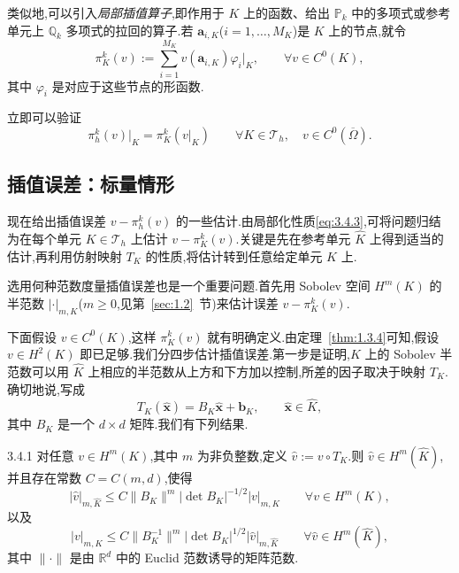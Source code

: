 类似地,可以引入\emph{局部插值算子},即作用于 \(K\) 上的函数、给出 \(\mathbb P_k\) 中的多项式或参考单元上 \(\mathbb Q_k\) 多项式的拉回的算子.若 \(\boldsymbol{a}_{i,K}\)(\(i=1,\ldots,M_K\))是 \(K\) 上的节点,就令
\begin{equation}\label{eq:3.4.2}
  \pi_K^k(v):=\sum_{i=1}^{M_K}v(\boldsymbol{a}_{i,K})\varphi_i|_K,
    \qquad \forall v\in C^0(K),
\end{equation}
其中 \(\varphi_i\) 是对应于这些节点的形函数.

立即可以验证
\begin{equation}\label{eq:3.4.3}
  \pi_h^k(v)|_K=\pi_K^k(v|_K)
  \qquad \forall K\in\mathcal T_h,\quad v\in C^0(\overline\Omega).
\end{equation}

\subsection{插值误差：标量情形}\label{sec:3.4.1}

现在给出插值误差 \(v-\pi_h^k(v)\) 的一些估计.由局部化性质\eqref{eq:3.4.3},可将问题归结为在每个单元 \(K\in\mathcal T_h\) 上估计 \(v-\pi_K^k(v)\).关键是先在参考单元 \(\widehat K\) 上得到适当的估计,再利用仿射映射 \(T_K\) 的性质,将估计转到任意给定单元 \(K\) 上.

选用何种范数度量插值误差也是一个重要问题.首先用 Sobolev 空间 \(H^m(K)\) 的半范数 \(|\cdot|_{m,K}\)(\(m\ge0\),见第~\ref{sec:1.2}~节)来估计误差 \(v-\pi_K^k(v)\).

下面假设 \(v\in C^0(K)\),这样 \(\pi_K^k(v)\) 就有明确定义.由定理~\ref{thm:1.3.4}可知,假设 \(v\in H^2(K)\) 即已足够.我们分四步估计插值误差.第一步是证明,\(K\) 上的 Sobolev 半范数可以用 \(\widehat K\) 上相应的半范数从上方和下方加以控制,所差的因子取决于映射 \(T_K\).确切地说,写成
\[
  T_K(\widehat{\boldsymbol{x}})=B_K\widehat{\boldsymbol{x}}+\boldsymbol{b}_K,
  \qquad \widehat{\boldsymbol{x}}\in\widehat K,
\]
其中 \(B_K\) 是一个 \(d\times d\) 矩阵.我们有下列结果.

\begin{proposition}[]{3.4.1}
对任意 \(v\in H^m(K)\),其中 \(m\) 为非负整数,定义 \(\widehat v:=v\circ T_K\).则 \(\widehat v\in H^m(\widehat K)\),并且存在常数 \(C=C(m,d)\),使得
\begin{equation}\label{eq:3.4.4}
  |\widehat v|_{m,\widehat K}\le C\|B_K\|^m|\det B_K|^{-1/2}|v|_{m,K}
  \qquad \forall v\in H^m(K),
\end{equation}
以及
\begin{equation}\label{eq:3.4.5}
  |v|_{m,K}\le C\|B_K^{-1}\|^m|\det B_K|^{1/2}|\widehat v|_{m,\widehat K}
  \qquad \forall\widehat v\in H^m(\widehat K),
\end{equation}
其中 \(\|\cdot\|\) 是由 \(\mathbb R^d\) 中的 Euclid 范数诱导的矩阵范数.
\end{proposition}

